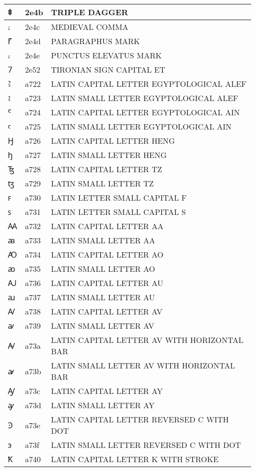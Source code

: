 \documentclass[12pt,letterpaper,openany]{book}
\begin{document}
\begin{center}
\begin{supertabular}{|m{0.25in}|m{0.5in}|m{4in}|}
			⹋ & 2e4b & TRIPLE DAGGER\\\hline
			⹌ & 2e4c & MEDIEVAL COMMA\\\hline
			⹍ & 2e4d & PARAGRAPHUS MARK\\\hline
			⹎ & 2e4e & PUNCTUS ELEVATUS MARK\\\hline
			⹒ & 2e52 & TIRONIAN SIGN CAPITAL ET\\\hline
			Ꜣ & a722 & LATIN CAPITAL LETTER EGYPTOLOGICAL ALEF\\\hline
			ꜣ & a723 & LATIN SMALL LETTER EGYPTOLOGICAL ALEF\\\hline
			Ꜥ & a724 & LATIN CAPITAL LETTER EGYPTOLOGICAL AIN\\\hline
			ꜥ & a725 & LATIN SMALL LETTER EGYPTOLOGICAL AIN\\\hline
			Ꜧ & a726 & LATIN CAPITAL LETTER HENG\\\hline
			ꜧ & a727 & LATIN SMALL LETTER HENG\\\hline
			Ꜩ & a728 & LATIN CAPITAL LETTER TZ\\\hline
			ꜩ & a729 & LATIN SMALL LETTER TZ\\\hline
			ꜰ & a730 & LATIN LETTER SMALL CAPITAL F\\\hline
			ꜱ & a731 & LATIN LETTER SMALL CAPITAL S\\\hline
			Ꜳ & a732 & LATIN CAPITAL LETTER AA\\\hline
			ꜳ & a733 & LATIN SMALL LETTER AA\\\hline
			Ꜵ & a734 & LATIN CAPITAL LETTER AO\\\hline
			ꜵ & a735 & LATIN SMALL LETTER AO\\\hline
			Ꜷ & a736 & LATIN CAPITAL LETTER AU\\\hline
			ꜷ & a737 & LATIN SMALL LETTER AU\\\hline
			Ꜹ & a738 & LATIN CAPITAL LETTER AV\\\hline
			ꜹ & a739 & LATIN SMALL LETTER AV\\\hline
			Ꜻ & a73a & LATIN CAPITAL LETTER AV WITH HORIZONTAL BAR\\\hline
			ꜻ & a73b & LATIN SMALL LETTER AV WITH HORIZONTAL BAR\\\hline
			Ꜽ & a73c & LATIN CAPITAL LETTER AY\\\hline
			ꜽ & a73d & LATIN SMALL LETTER AY\\\hline
			Ꜿ & a73e & LATIN CAPITAL LETTER REVERSED C WITH DOT\\\hline
			ꜿ & a73f & LATIN SMALL LETTER REVERSED C WITH DOT\\\hline
			Ꝁ & a740 & LATIN CAPITAL LETTER K WITH STROKE\\\hline

\end{supertabular}
\end{center}
\end{document}
